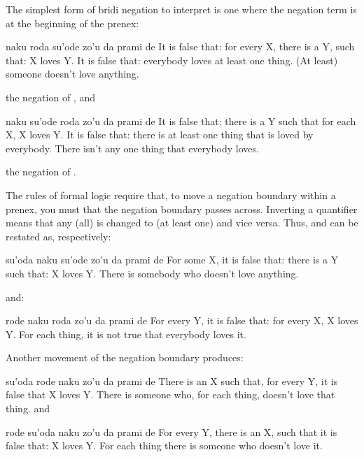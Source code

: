 The simplest form of bridi negation to interpret is one
    where the negation term is at the beginning of the prenex:
\begin{example}
naku roda su'ode zo'u\n
\T	da prami de\n
It is false that: for every X, there is a Y, such that:\n
\T	X loves Y.\n
It is false that: everybody loves at least one thing.\n
(At least) someone doesn't love anything.
\end{example}

{\noindent}the negation of , and
\begin{example}
naku su'ode roda zo'u\n
\T	da prami de\n
It is false that: there is a Y such that for each X,\n
\T	X loves Y.\n
It is false that: there is at least one thing that is\n
\T	loved by everybody.\n
There isn't any one thing that everybody loves.
\end{example}

{\noindent}the negation of . 

The rules of formal logic require that, to move a negation
    boundary within a prenex, you must 
    that the negation boundary passes across. Inverting a
    quantifier means that any  (all) is changed to 
    (at least one) and vice versa. Thus,  and  can be restated as,
    respectively:
\begin{example}
su'oda naku su'ode zo'u\n
\T	da prami de\n
For some X, it is false that: there is a Y such that:\n
\T	X loves Y.\n
There is somebody who doesn't love anything.
\end{example}

{\noindent}and:
\begin{example}
rode naku roda zo'u da prami de\n
For every Y, it is false that: for every X, X loves Y.\n
For each thing, it is not true that everybody loves it.
\end{example}

Another movement of the negation boundary produces:
\begin{example}
su'oda rode naku zo'u\n
\T	da prami de\n
There is an X such that, for every Y,\n
\T	it is false that X loves Y.\n
There is someone who, for each thing,\n
\T	doesn't love that thing.
and
\end{example}

\begin{example}
rode su'oda naku zo'u da prami de\n
For every Y, there is an X, such that it is false that:\n
\T	X loves Y.\n
For each thing there is someone who doesn't love it.
\end{example}

